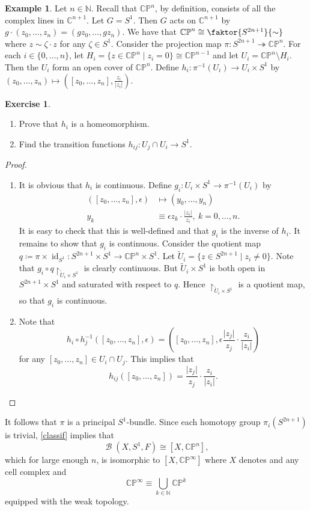 \documentclass[10pt,letterpaper,cm]{nupset}
\theoremstyle{definition}
\newtheorem{exmp}[defn]{Example}
\theoremstyle{theorem}
\newtheorem{exercise}[defn]{Exercise}
\theoremstyle{remark}
\newcommand{\C}{\mathbb C}
\newcommand{\CP}{\mathbb{CP}}
\newcommand{\N}{\mathbb N}
\newcommand{\1}{\mathbb{1}}
\newcommand{\0}{\vec 0}
\DeclareMathOperator{\id}{id}
\DeclareMathOperator{\B}{\mathcal{B}}
\newcommand{\be}{\begin{enumerate}}
\newcommand{\ee}{\end{enumerate}}
\begin{document}
\begin{exmp}
Let $n\in \N$. Recall that $\CP^n$, by definition, consists of all the complex lines in $\C^{n+1}$. Let $G = S^1$. Then $G$ acts on $\C^{n+1}$ by $g\cdot \left(z_0, \ldots, z_n\right) = \left(gz_0, \ldots, gz_n\right)$. We have that $\CP^n \cong \faktor{S^{2n+1}}{\sim}$ where $z\sim \zeta\cdot z$ for any $\zeta \in S^1$. Consider the projection map $\pi : S^{2n+1} \twoheadrightarrow \CP^n$. For each $i\in \{0, \ldots, n\}$, let $H_i = \{z\in \CP^n \mid z_i =0\} \cong \CP^{n-1}$ and let $U_i = \CP^n \setminus H_i$. Then the $U_i$ form an open cover of $\CP^n$.  Define $h_i : \pi^{-1}\left(U_i\right) \to U_i \times S^1$ by $\left(z_0, \ldots, z_n\right) \mapsto \left(\left[z_0, \ldots, z_n\right], \frac{z_i}{\lvert{z_i}\rvert}\right)$. 

\begin{exercise} $ $
\be
\item Prove that $h_i$ is a homeomorphism.
\item Find the transition functions $h_{ij} : U_j \cap U_i \to S^1$.
\ee
\end{exercise}
\begin{proof} $ $
\be
\item It is obvious that $h_i$ is continuous. Define $g_i : U_i \times S^1 \to \pi^{-1}\left(U_i\right)$ by 
\begin{align*}
\left(\left[z_0, \ldots, z_n\right], \epsilon \right) &  \mapsto \left(y_0, \ldots, y_n\right)
\\ y_k & \equiv \epsilon{z_k}\cdot \frac{\lvert{z_i}\rvert}{z_i}, \ k =0, \ldots, n.
\end{align*}
It is easy to check that this is well-defined and that $g_i$ is the inverse of $h_i$. It remains to show that $g_i$ is continuous. Consider the quotient map  $q\coloneqq \pi \times \id_{S^1}: S^{2n+1} \times S^1 \to \CP^n \times S^1$. Let $\widetilde{U}_i = \{z \in S^{2n+1} \mid z_i \ne 0\}$. Note that $g_i \circ q\restriction_{\widetilde{U}_i \times S^1}$ is clearly continuous. But $\widetilde{U}_i \times S^1$ is both open in $S^{2n+1} \times S^1$ and saturated with respect to $q$. Hence $\restriction_{\widetilde{U}_i \times S^1}$ is a quotient map, so that $g_i$ is continuous.  
\item Note that 
\[
h_i \circ h_j^{-1}\left(\left[z_0, \ldots, z_n\right], \epsilon\right) = \left(\left[z_0, \ldots, z_n\right], \epsilon  \frac{\lvert{z_j}\rvert}{z_j} \cdot \frac{z_i}{\lvert{z_i}\rvert}\right)
\] for any $\left[z_0, \ldots, z_n\right] \in U_i \cap U_j$. This implies that $$h_{ij}\left(\left[z_0, \ldots, z_n\right]\right) = \frac{\lvert{z_j}\rvert}{z_j} \cdot \frac{z_i}{\lvert{z_i}\rvert}.$$
\ee
\end{proof}

It follows that $\pi$ is a principal $S^1$-bundle. Since each homotopy group $\pi_i\left(S^{2n+1}\right)$ is trivial,  \cref{classif} implies that $$\B\left(X, S^1, F\right) \cong \left[X, \CP^n\right],$$ which for large enough $n$, is isomorphic to $\left[X, \CP^{\infty}\right]$ where $X$ denotes and any cell complex and $$\CP^{\infty} \equiv \bigcup_{k\in \N}\CP^k$$ equipped with the weak topology.
\end{exmp}
\end{document}
